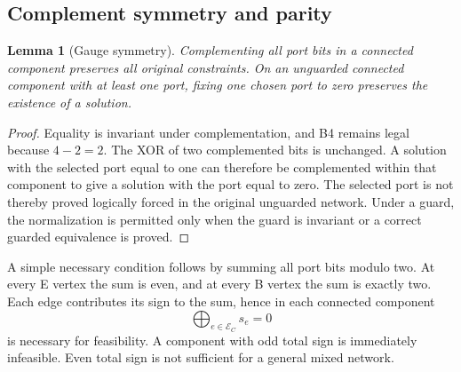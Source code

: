 \documentclass[11pt,letterpaper]{article}
\newtheorem{lemma}[theorem]{Lemma}
\theoremstyle{definition}
\begin{document}
\subsection{Complement symmetry and parity}
\begin{lemma}[Gauge symmetry]\label{lem:gauge}
Complementing all port bits in a connected component preserves all original constraints. On an unguarded connected component with at least one port, fixing one chosen port to zero preserves the existence of a solution.
\end{lemma}
\begin{proof}
Equality is invariant under complementation, and B4 remains legal because \(4-2=2\). The XOR of two complemented bits is unchanged. A solution with the selected port equal to one can therefore be complemented within that component to give a solution with the port equal to zero. The selected port is not thereby proved logically forced in the original unguarded network. Under a guard, the normalization is permitted only when the guard is invariant or a correct guarded equivalence is proved.
\end{proof}
A simple necessary condition follows by summing all port bits modulo two. At every E vertex the sum is even, and at every B vertex the sum is exactly two. Each edge contributes its sign to the sum, hence in each connected component
\begin{equation}\label{eq:parityglobal}
 \bigoplus_{e\in\mathcal E_C}s_e=0
\end{equation}
is necessary for feasibility. A component with odd total sign is immediately infeasible. Even total sign is not sufficient for a general mixed network.
\end{document}
